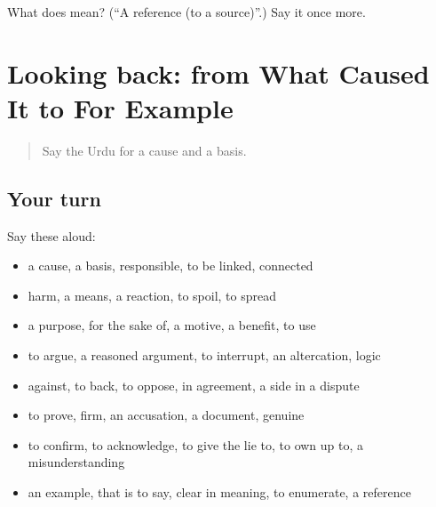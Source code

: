 \begin{tcolorbox}[breakable,colback=teal!4,colframe=teal!35!black,title={Before you move on}]
What does  mean? (\textquotedblleft{}A reference (to a source)\textquotedblright{}.) Say it once more.
\end{tcolorbox}
\section[(dialogue)]{Looking back: from What Caused It to For Example}

\label{lesson:UR-R338-review-331-338}



\begin{quote}
Say the Urdu for a cause and a basis.
\end{quote}

\subsection*{Your turn}
Say these aloud:

\begin{itemize}
\raggedright
  \item a cause, a basis, responsible, to be linked, connected
  \item harm, a means, a reaction, to spoil, to spread
  \item a purpose, for the sake of, a motive, a benefit, to use
  \item to argue, a reasoned argument, to interrupt, an altercation, logic
  \item against, to back, to oppose, in agreement, a side in a dispute
  \item to prove, firm, an accusation, a document, genuine
  \item to confirm, to acknowledge, to give the lie to, to own up to, a misunderstanding
  \item an example, that is to say, clear in meaning, to enumerate, a reference
\end{itemize}

